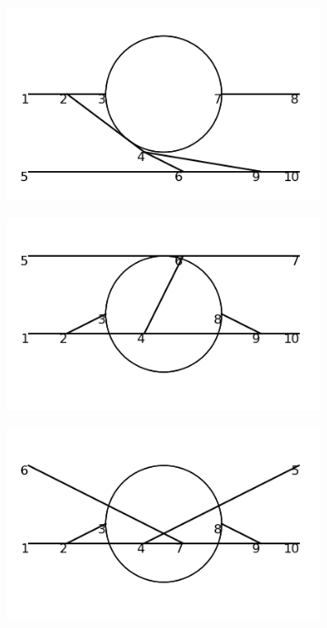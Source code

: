 \documentclass[11pt,a4paper,twoside,pdf]{article}
\numberwithin{equation}{section}
\begin{document}
\begin{figure}[h!]
\begin{subfigure}[t]{0.16\textwidth}
    \end{subfigure}
    \hfill
    \begin{subfigure}[t]{0.16\textwidth}
        \centering
        \includegraphics[width=\textwidth]{plots/order6_2to2/12.png}
    \end{subfigure}
    \hfill
    \begin{subfigure}[t]{0.16\textwidth}
        \centering
        \includegraphics[width=\textwidth]{plots/order6_2to2/13.png}
    \end{subfigure}
    \hfill
    \begin{subfigure}[t]{0.16\textwidth}
        \centering
        \includegraphics[width=\textwidth]{plots/order6_2to2/14.png}

\end{subfigure}
\end{figure}
\end{document}
